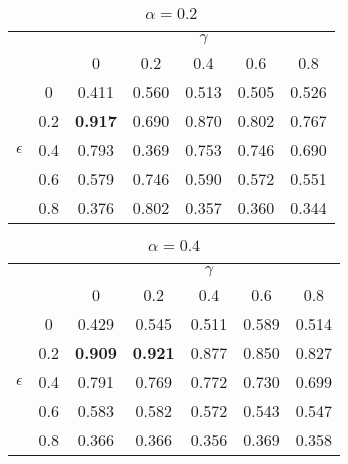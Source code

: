 \documentclass[12pt]{article}
\begin{document}
\vspace{2ex}
\begin{table}[]
\centering
\caption{$\alpha = 0.2$}
\label{}
\begin{tabular}{|cc|ccccc|}
\hline
            &     &                &         & $\gamma$ &        &       \\ %
            &     & 0              & 0.2     & 0.4      & 0.6    & 0.8   \\ \hline
            & 0   & 0.411          & 0.560   & 0.513    & 0.505  & 0.526 \\ %
            & 0.2 & \textbf{0.917} & 0.690   & 0.870    & 0.802  & 0.767 \\ %
 $\epsilon$ & 0.4 & 0.793          & 0.369   & 0.753    & 0.746  & 0.690 \\ %
            & 0.6 & 0.579          & 0.746   & 0.590    & 0.572  & 0.551 \\ %
            & 0.8 & 0.376          & 0.802   & 0.357    & 0.360  & 0.344 \\ \hline
\end{tabular}
\end{table}

\vspace{2ex}
\begin{table}[]
\centering
\caption{$\alpha = 0.4$}
\label{}
\begin{tabular}{|cc|ccccc|}
\hline
            &     &                &                & $\gamma$ &         &       \\ %
            &     & 0              & 0.2            & 0.4      & 0.6     & 0.8   \\ \hline
            & 0   & 0.429          & 0.545          & 0.511    & 0.589   & 0.514 \\ %
            & 0.2 & \textbf{0.909} & \textbf{0.921} & 0.877    & 0.850   & 0.827 \\ %
 $\epsilon$ & 0.4 & 0.791          & 0.769          & 0.772    & 0.730   & 0.699 \\ %
            & 0.6 & 0.583          & 0.582          & 0.572    & 0.543   & 0.547 \\ %
            & 0.8 & 0.366          & 0.366          & 0.356    & 0.369   & 0.358 \\ \hline
\end{tabular}
\end{table}
\end{document}
